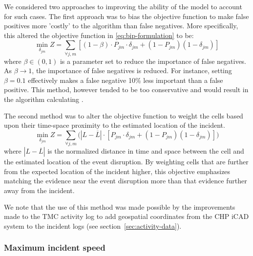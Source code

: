 \documentclass[12pt]{report}
\newcounter{time}
\newcounter{space}
\begin{document}
We considered two approaches to improving the ability of the model to
account for such cases.  The first approach was to bias the objective
function to make false positives more 'costly' to the algorithm than
false negatives.  More specifically, this altered the objective
function in \eqref{eq:bip-formulation} to be:
\begin{equation}
  \label{eq:false-positive-bias}
  \min\limits_{\delta_{jm}} Z = \sum\limits_{\forall{}j,m}\left[(1-\beta)\cdot{}P_{jm}\cdot{}\delta_{jm}+(1-P_{jm})(1-\delta_{jm})\right]
\end{equation}
where $\beta \in (0,1)$ is a parameter set to reduce the importance of
false negatives.  As $\beta \rightarrow 1$, the importance of false
negatives is reduced.  For instance, setting $\beta = 0.1$ effectively
makes a false negative 10\% less important than a false positive.
%
This method, however tended to be too conservative and would result in
the algorithm calculating .

The second method was to alter the objective function to weight the
cells based upon their time-space proximity to the estimated location
of the incident.
\begin{equation}
    \label{eq:distance-weighting}
    \min\limits_{\delta_{jm}} Z = \sum\limits_{\forall{}j,m}\bigg(\left|L - \overline{L}\right|\cdot{}\left[P_{jm}\cdot{}\delta_{jm}+(1-P_{jm})(1-\delta_{jm})\right]\bigg)
\end{equation}
where $\left|L - \overline{L}\right|$ is the normalized distance in
time and space between the cell and the estimated location of the
event disruption.  By weighting cells that are further from the
expected location of the incident higher, this objective emphasizes
matching the evidence near the event disruption more than that
evidence further away from the incident.  


We note that the use of this method was made possible by the
improvements made to the \ac{TMC} activity log to add geospatial
coordinates from the \ac{CHP} \ac{iCAD} system to the incident logs
(see section~\ref{sec:activity-data}).


\subsubsection{Maximum incident speed}
\label{sec:max-inc-spd}
\end{document}

